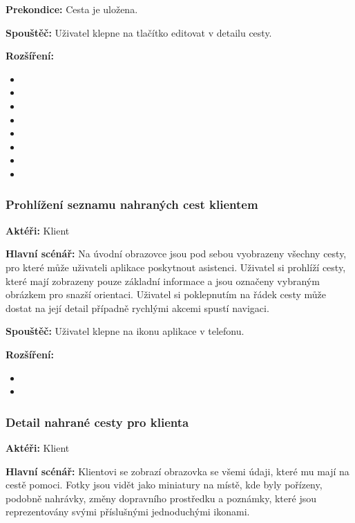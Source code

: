 \documentclass[czech,master,public,dept460,male,java,cpdeclaration]{diploma}
\newcommand{\usecase}[2]{\subsubsection{#1}\label{#2}}
\begin{document}
\vspace{0.1cm}
\noindent
\textbf{Prekondice:} Cesta je uložena.

\vspace{0.1cm}
\noindent
\textbf{Spouštěč:} Uživatel klepne na tlačítko editovat v detailu cesty.

\vspace{0.1cm}
\noindent
\textbf{Rozšíření:}
\begin{itemize}
  \item {}
  \item {}
  \item {}
  \item {}
    \item {}
    \item {}
    \item {}
    \item {}
\end{itemize}

\usecase{Prohlížení seznamu nahraných cest klientem}{prohlizeniklient}
\textbf{Aktéři:} Klient

\vspace{0.1cm}
\noindent
\textbf{Hlavní scénář:} Na úvodní obrazovce jsou pod sebou vyobrazeny všechny cesty, pro které může
uživateli aplikace poskytnout asistenci. Uživatel si prohlíží cesty, které mají zobrazeny pouze
základní informace a jsou označeny vybraným obrázkem pro snazší orientaci. Uživatel si poklepnutím
na řádek cesty může dostat na její detail případně rychlými akcemi spustí navigaci.

\vspace{0.1cm}
\noindent
\textbf{Spouštěč:} Uživatel klepne na ikonu aplikace v telefonu.

\vspace{0.1cm}
\noindent
\textbf{Rozšíření:}
\begin{itemize}
  \item {}
  \item {}
\end{itemize}

\usecase{Detail nahrané cesty pro klienta}{detailklient}
\textbf{Aktéři:} Klient

\vspace{0.1cm}
\noindent
\textbf{Hlavní scénář:} Klientovi se zobrazí obrazovka se všemi údaji, které mu mají na cestě pomoci.
Fotky jsou vidět jako miniatury na místě, kde byly pořízeny, podobně nahrávky, změny dopravního prostředku
a poznámky, které jsou reprezentovány svými příslušnými jednoduchými ikonami.
\end{document}
